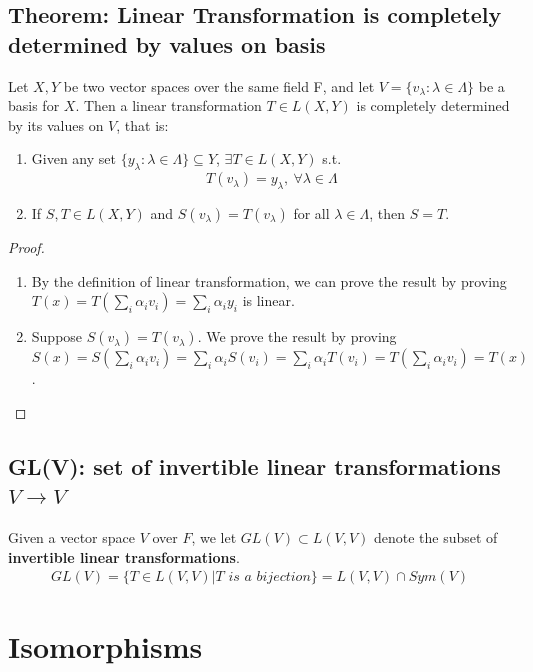 \documentclass[11pt]{elegantbook}
\begin{document}
\subsection{Theorem: Linear Transformation is completely determined by values on basis}
\begin{theorem}
    Let $X, Y$ be two vector spaces over the same field F, and let $V = \{v_\lambda : \lambda \in \Lambda\}$ be a basis for $X$. Then a linear transformation $T \in L(X, Y)$ is completely determined by its values on $V$, that is:
    \begin{enumerate}
        \item Given any set $\{y_\lambda : \lambda \in \Lambda\} \subseteq Y$, $\exists T \in L(X, Y)$ s.t. $$T(v_\lambda)=y_\lambda,\ \forall \lambda\in\Lambda$$
        \item If $S,T\in L(X,Y)$ and $S(v_\lambda)=T(v_\lambda)$ for all $\lambda\in\Lambda$, then $S=T$.
    \end{enumerate}
\end{theorem}
\begin{proof}
    \begin{enumerate}
        \item By the definition of linear transformation, we can prove the result by proving $T(x)=T(\sum_i\alpha_i v_i)=\sum_i\alpha_i y_i$ is linear.
        \item Suppose $S(v_\lambda)=T(v_\lambda)$. We prove the result by proving $S(x)=S(\sum_i\alpha_i v_i)=\sum_i\alpha_i S(v_i)=\sum_i\alpha_i T(v_i)=T(\sum_i\alpha_i v_i)=T(x)$.
    \end{enumerate}

\end{proof}

\subsection{GL(V): set of invertible linear transformations $V \rightarrow	V$}
Given a vector space $V$ over $F$, we let $GL(V) \subset L(V, V)$ denote the subset of \textbf{invertible linear transformations}.
\begin{equation}
    \begin{aligned}
        GL(V)=\{T\in L(V, V)| T \textit{ is a bijection}\}=L(V, V)\cap Sym(V)
    \end{aligned}
    \nonumber
\end{equation}


\section{Isomorphisms}
\end{document}
